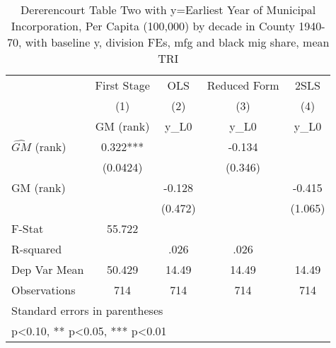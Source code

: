 \begin{table}[htbp]\centering
\def\sym#1{\ifmmode^{#1}\else\(^{#1}\)\fi}
\caption{Dererencourt Table Two with y=Earliest Year of Municipal Incorporation, Per Capita (100,000) by decade in County 1940-70, with baseline y, division FEs, mfg and black mig share, mean TRI}
\begin{tabular}{l*{4}{c}}
\toprule
                    & First Stage   &         OLS   &Reduced Form   &        2SLS   \\
                    &\multicolumn{1}{c}{(1)}&\multicolumn{1}{c}{(2)}&\multicolumn{1}{c}{(3)}&\multicolumn{1}{c}{(4)}\\
                    &\multicolumn{1}{c}{GM  (rank)}&\multicolumn{1}{c}{y\_L0}&\multicolumn{1}{c}{y\_L0}&\multicolumn{1}{c}{y\_L0}\\
\midrule
$\hat{GM}$ (rank)   &       0.322***&               &      -0.134   &               \\
                    &    (0.0424)   &               &     (0.346)   &               \\
\addlinespace
GM  (rank)          &               &      -0.128   &               &      -0.415   \\
                    &               &     (0.472)   &               &     (1.065)   \\
\midrule
F-Stat              &      55.722   &               &               &               \\
R-squared           &               &        .026   &        .026   &               \\
Dep Var Mean        &      50.429   &       14.49   &       14.49   &       14.49   \\
Observations        &         714   &         714   &         714   &         714   \\
\bottomrule
\multicolumn{5}{l}{\footnotesize Standard errors in parentheses}\\
\multicolumn{5}{l}{\footnotesize * p<0.10, ** p<0.05, *** p<0.01}\\
\end{tabular}
\end{table}

